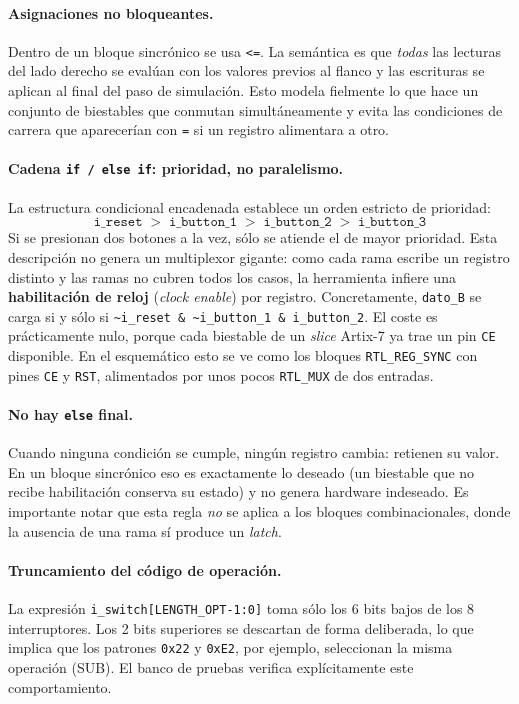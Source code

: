 \documentclass[12pt,a4paper]{article}
\begin{document}
\paragraph{Asignaciones no bloqueantes.} Dentro de un bloque sincrónico se usa
\texttt{<=}. La semántica es que \emph{todas} las lecturas del lado derecho se evalúan con
los valores previos al flanco y las escrituras se aplican al final del paso de simulación.
Esto modela fielmente lo que hace un conjunto de biestables que conmutan simultáneamente y
evita las condiciones de carrera que aparecerían con \texttt{=} si un registro alimentara a
otro.

\paragraph{Cadena \texttt{if / else if}: prioridad, no paralelismo.} La estructura
condicional encadenada establece un orden estricto de prioridad:
$$\texttt{i\_reset} \;>\; \texttt{i\_button\_1} \;>\; \texttt{i\_button\_2} \;>\; \texttt{i\_button\_3}$$
Si se presionan dos botones a la vez, sólo se atiende el de mayor prioridad. Esta
descripción no genera un multiplexor gigante: como cada rama escribe un registro distinto y
las ramas no cubren todos los casos, la herramienta infiere una \textbf{habilitación de
reloj} (\textit{clock enable}) por registro. Concretamente, \texttt{dato\_B} se carga si y
sólo si \texttt{\textasciitilde i\_reset \& \textasciitilde i\_button\_1 \& i\_button\_2}.
El coste es prácticamente nulo, porque cada biestable de un \textit{slice} Artix-7 ya trae
un pin \texttt{CE} disponible. En el esquemático esto se ve como los bloques
\texttt{RTL\_REG\_SYNC} con pines \texttt{CE} y \texttt{RST}, alimentados por unos pocos
\texttt{RTL\_MUX} de dos entradas.

\paragraph{No hay \texttt{else} final.} Cuando ninguna condición se cumple, ningún registro
cambia: retienen su valor. En un bloque sincrónico eso es exactamente lo deseado (un
biestable que no recibe habilitación conserva su estado) y no genera hardware indeseado. Es
importante notar que esta regla \emph{no} se aplica a los bloques combinacionales, donde la
ausencia de una rama sí produce un \textit{latch}.

\paragraph{Truncamiento del código de operación.} La expresión
\texttt{i\_switch[LENGTH\_OPT-1:0]} toma sólo los 6 bits bajos de los 8 interruptores. Los
2 bits superiores se descartan de forma deliberada, lo que implica que los patrones
\texttt{0x22} y \texttt{0xE2}, por ejemplo, seleccionan la misma operación (SUB). El banco
de pruebas verifica explícitamente este comportamiento.
\end{document}
